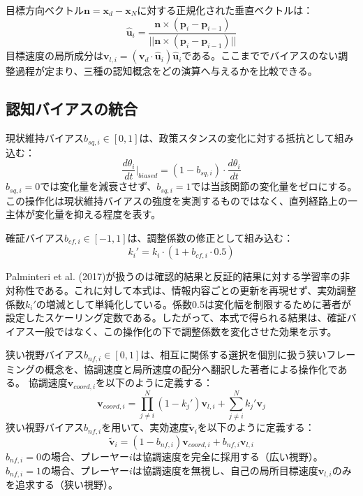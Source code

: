 目標方向ベクトル$\mathbf{n} = \mathbf{x}_d - \mathbf{x}_N$に対する正規化された垂直ベクトルは：
\begin{equation}
\hat{\mathbf{u}}_i = \frac{\mathbf{n} \times (\mathbf{p}_i - \mathbf{p}_{i-1})}{||\mathbf{n} \times (\mathbf{p}_i - \mathbf{p}_{i-1})||}
\end{equation}
目標速度の局所成分は$\mathbf{v}_{l,i} = (\mathbf{v}_d \cdot \hat{\mathbf{u}}_i) \hat{\mathbf{u}}_i$である。ここまででバイアスのない調整過程が定まり、三種の認知概念をどの演算へ与えるかを比較できる。

\subsection{認知バイアスの統合}

現状維持バイアス$b_{sq,i} \in [0,1]$は、政策スタンスの変化に対する抵抗として組み込む\cite{samuelson1988status}：
\begin{equation}
\frac{d\theta_i}{dt} \bigg|_{biased} = (1 - b_{sq,i}) \cdot \frac{d\theta_i}{dt}
\end{equation}
$b_{sq,i} = 0$では変化量を減衰させず、$b_{sq,i} = 1$では当該関節の変化量をゼロにする。この操作化は現状維持バイアスの強度を実測するものではなく、直列経路上の一主体が変化量を抑える程度を表す。

確証バイアス$b_{cf,i} \in [-1,1]$は、調整係数の修正として組み込む\cite{bergerot2024moderate}：
\begin{equation}
k_i' = k_i \cdot (1 + b_{cf,i} \cdot 0.5)
\end{equation}

Palminteri et al. (2017)が扱うのは確認的結果と反証的結果に対する学習率の非対称性である\cite{palminteri2017confirmation}。これに対して本式は、情報内容ごとの更新を再現せず、実効調整係数$k_i'$の増減として単純化している。係数0.5は変化幅を制限するために著者が設定したスケーリング定数である。したがって、本式で得られる結果は、確証バイアス一般ではなく、この操作化の下で調整係数を変化させた効果を示す。

狭い視野バイアス$b_{nf,i} \in [0,1]$は、相互に関係する選択を個別に扱う狭いフレーミングの概念\cite{kahneman2011thinking}を、協調速度と局所速度の配分へ翻訳した著者による操作化である。
協調速度$\mathbf{v}_{coord,i}$を以下のように定義する：
\begin{equation}
\mathbf{v}_{coord,i} = \prod_{j \neq i}^{N} (1 - k_j') \mathbf{v}_{l,i} + \sum_{j \neq i}^{N} k_j' \mathbf{v}_j
\end{equation}
狭い視野バイアス$b_{nf,i}$を用いて、実効速度$\tilde{\mathbf{v}}_i$を以下のように定義する：
\begin{equation}
\tilde{\mathbf{v}}_i = (1 - b_{nf,i}) \mathbf{v}_{coord,i} + b_{nf,i} \mathbf{v}_{l,i}
\end{equation}
$b_{nf,i} = 0$の場合、プレーヤー$i$は協調速度を完全に採用する（広い視野）。$b_{nf,i} = 1$の場合、プレーヤー$i$は協調速度を無視し、自己の局所目標速度$\mathbf{v}_{l,i}$のみを追求する（狭い視野）。


